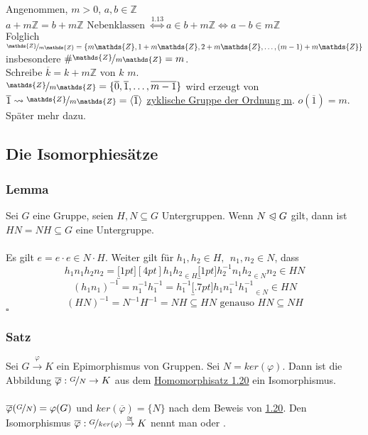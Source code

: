 Angenommen, $m>0$, $a,b \in \mathds{Z}$\\
$a+m\mathds{Z}=b+m\mathds{Z} \text{ Nebenklassen }\stackrel{\hyperref[sub:nebenklassen]{1.13}}{\Leftrightarrow} a\in b+m\mathds{Z} \Leftrightarrow a-b \in m\mathds{Z}$\\
Folglich $\nicefrac{\mathds{Z}}{m\mathds{Z}}=\{m\mathds{Z},1+m\mathds{Z},2+m\mathds{Z},\dots,(m-1)+m\mathds{Z} \}$ insbesondere $\#\nicefrac{\mathds{Z}}{m\mathds{Z}}=m$.\\
Schreibe $\overline{k}=k+m\mathds{Z}$  von $k$  $m$.\\
$\nicefrac{\mathds{Z}}{m\mathds{Z}}=\{\overline{0},\overline{1},\dots,\overline{m-1} \}$ wird erzeugt von $\overline{1} \rightsquigarrow \nicefrac{\mathds{Z}}{m\mathds{Z}}=\lh{\overline{1}}$ \uline{zyklische Gruppe der Ordnung m}. $o(\overline{1})=m$. Später mehr dazu.

\subsection{Die Isomorphiesätze}
\label{sub:isomorphiesaetze}
\subsubsection*{Lemma}
Sei $G$ eine Gruppe, seien $H,N \subseteq G$ Untergruppen. Wenn $N\trianglelefteqslant G$ gilt, dann ist $ HN=NH \subseteq G$ eine Untergruppe.\\

\\
Es gilt $e=e\cdot e\in N\cdot H$. Weiter gilt für $h_1,h_2 \in H,~~n_1,n_2 \in N$, dass
\[h_1n_1h_2n_2=\underbracket[1pt][4pt]{h_1h_2}_{\in H} \underbracket[1pt]{h_2^{-1}n_1h_2}_{\in N}n_2 \in HN \]
\[(h_1n_1)^{-1}=n_1^{-1}h_1^{-1}=h_1^{-1}\underbracket[.7pt]{h_1n_1^{-1}h_1^{-1}}_{\in N} \in HN \]
\[(HN)^{-1}=N^{-1}H^{-1}=NH \subseteq HN \text{ genauso } HN \subseteq NH \]
\hfill $\square$

\subsubsection*{Satz}
Sei $G\stackrel{\varphi}{\to}K$ ein Epimorphismus von Gruppen. Sei $N=ker(\varphi)$. Dann ist die Abbildung $\overline{\varphi}:\nicefrac{G}{N}\to K$ aus dem \hyperref[sub:der_homomorphiesatz]{Homomorphisatz 1.20} ein Isomorphismus.\\

\\
$\overline{\varphi}(\nicefrac{G}{N})=\varphi(G)$ und $ker(\overline{\varphi})=\{N\}$ nach dem Beweis von \hyperref[sub:der_homomorphiesatz]{1.20}. Den Isomorphismus $\overline{\varphi}:\nicefrac{G}{ker(\varphi)} \stackrel{\cong}{\to}K$ nennt man  oder .

